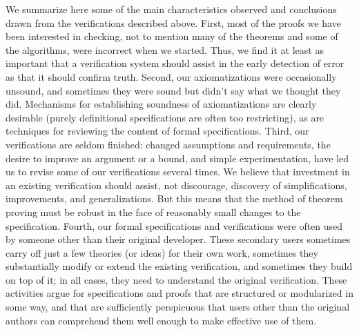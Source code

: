 We summarize here some of the main characteristics observed and
conclusions drawn from the verifications described above.  First,
most of the proofs we have been interested in checking, not to
mention many of the theorems and some of the algorithms, were
incorrect when we started.  Thus, we find it at least as important
that a verification system should assist in the early detection of
error as that it should confirm truth.  Second, our axiomatizations
were occasionally unsound, and sometimes they were sound but didn't
say what we thought they did.  Mechanisms for establishing soundness
of axiomatizations are clearly desirable (purely definitional
specifications are often too restricting), as are 
techniques for reviewing the content of formal specifications.
Third, our verifications are seldom finished: changed assumptions and
requirements, the desire to improve an argument or a bound, and
simple experimentation, have led us to revise some of our
verifications several times.  We believe that investment in an
existing verification should assist, not discourage, discovery of
simplifications, improvements, and generalizations.  But this means
that the method of theorem proving must be robust in the face of
reasonably small changes to the specification.  Fourth, our formal
specifications and verifications were often used by someone other
than their original developer.  These secondary users sometimes carry
off just a few theories (or ideas) for their own work, sometimes they
substantially modify or extend the existing verification, and
sometimes they build on top of it; in all cases, they need to
understand the original verification.  These activities argue for
specifications and proofs that are structured or modularized in some
way, and that are sufficiently perspicuous that users other than the
original authors can comprehend them well enough to make effective
use of them.

